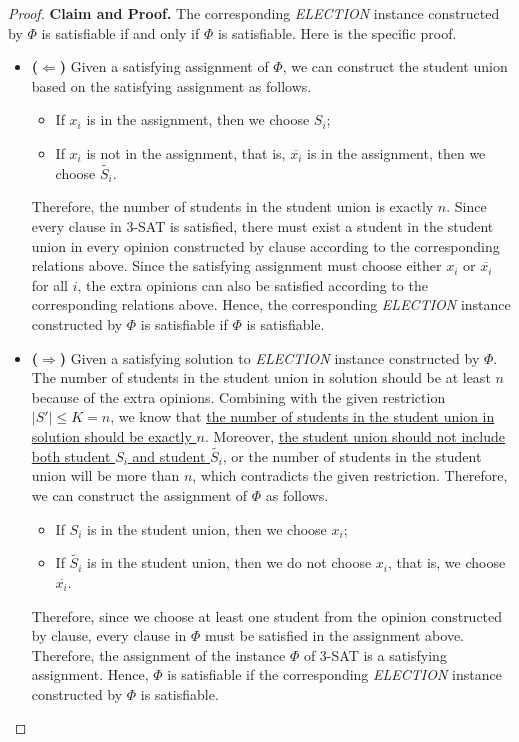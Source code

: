 \documentclass[12pt,a4paper]{article}
\theoremstyle{definition}
\begin{document}
\begin{enumerate}
\begin{proof}
    \textbf{Claim and Proof.} The corresponding \emph{ELECTION} instance constructed by $\Phi$ is satisfiable if and only if $\Phi$ is satisfiable. Here is the specific proof.
    \begin{itemize}
    \item \textbf{($\Longleftarrow$)} Given a satisfying assignment of $\Phi$, we can construct the student union based on the satisfying assignment as follows.
        \begin{itemize}
        \item If $x_i$ is in the assignment, then we choose $S_i$;
        \item If $x_i$ is not in the assignment, that is, $\overline{x_i}$ is in the assignment, then we choose $\tilde{S_i}$.
        \end{itemize}
        Therefore, the number of students in the student union is exactly $n$. Since every clause in 3-SAT is satisfied, there must exist a student in the student union in every opinion constructed by clause according to the corresponding relations above. Since the satisfying assignment must choose either $x_i$ or $\overline{x_i}$ for all $i$, the extra opinions can also be satisfied according to the corresponding relations above. Hence, the corresponding \emph{ELECTION} instance constructed by $\Phi$ is satisfiable if $\Phi$ is satisfiable.
    \item \textbf{($\Longrightarrow$)} Given a satisfying solution to \emph{ELECTION} instance constructed by $\Phi$. The number of students in the student union in solution should be at least $n$ because of the extra opinions. Combining with the given restriction $|S'|\leq K=n$, we know that \underline{the number of students in the student union in solution should be exactly $n$}. Moreover, \underline{the student union should not include both student $S_i$ and student $\tilde{S_i}$}, or the number of students in the student union will be more than $n$, which contradicts the given restriction. Therefore, we can construct the assignment of $\Phi$ as follows.
        \begin{itemize}
        \item If $S_i$ is in the student union, then we choose $x_i$;
        \item If $\tilde{S_i}$ is in the student union, then we do not choose $x_i$, that is, we choose $\overline{x_i}$.
        \end{itemize}
        Therefore, since we choose at least one student from the opinion constructed by clause, every clause in $\Phi$ must be satisfied in the assignment above. Therefore, the assignment of the instance $\Phi$ of 3-SAT is a satisfying assignment. Hence, $\Phi$ is satisfiable if the corresponding \emph{ELECTION} instance constructed by $\Phi$ is satisfiable.

\end{itemize}
\end{proof}
\end{enumerate}
\end{document}
